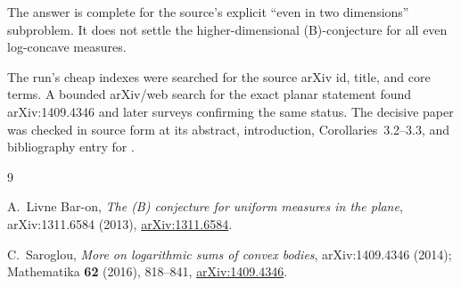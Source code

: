 \documentclass[11pt]{article}
\begin{document}
The answer is complete for the source's explicit ``even in two dimensions''
subproblem.  It does not settle the higher-dimensional (B)-conjecture for all
even log-concave measures.

The run's cheap indexes were searched for the source arXiv id, title, and core
terms.  A bounded arXiv/web search for the exact planar statement found
arXiv:1409.4346 and later surveys confirming the same status.  The decisive
paper was checked in source form at its abstract, introduction,
Corollaries~3.2--3.3, and bibliography entry for \cite{Livne}.

\begin{thebibliography}{9}

A.~Livne Bar-on,
\emph{The (B) conjecture for uniform measures in the plane},
arXiv:1311.6584 (2013),
\href{https://arxiv.org/abs/1311.6584}{arXiv:1311.6584}.

C.~Saroglou,
\emph{More on logarithmic sums of convex bodies},
arXiv:1409.4346 (2014); Mathematika \textbf{62} (2016), 818--841,
\href{https://arxiv.org/abs/1409.4346}{arXiv:1409.4346}.

\end{thebibliography}
\end{document}
